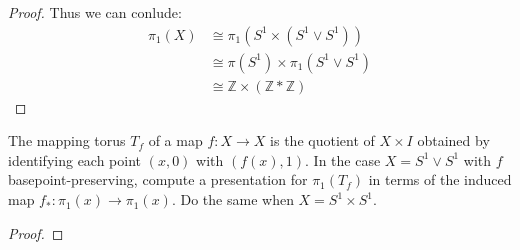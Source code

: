 \documentclass[12pt]{article}
\newenvironment{statement}[2][Statement]{\begin{trivlist}
\item[\hskip \labelsep {\bfseries #1}\hskip \labelsep {\bfseries #2.}]}{\end{trivlist}}
\begin{document}
\begin{proof}
  \par Thus we can conlude:
  \begin{align*}
    \pi_1(X) & \cong \pi_1(S^1 \times (S^1 \vee S^1)) \\
             & \cong \pi(S^1) \times \pi_1(S^1 \vee S^1) \\
             & \cong \mathbb{Z} \times (\mathbb{Z} \ast \mathbb{Z})
  \end{align*}
\end{proof}

\begin{statement}[Problem]{5}
 The mapping torus $T_f$ of a map $f:X \to X$ is the quotient of $X \times I$ 
 obtained by identifying each point $(x,0)$ with $(f(x),1)$. In the case $X = S^1 \vee S^1$ with $f$ basepoint-preserving,
 compute a presentation for $\pi_1(T_f)$ in terms of the induced map $f_*: \pi_1(x) \to \pi_1(x)$. Do the same when $X = S^1 \times S^1$.
\end{statement}
\begin{proof}

\end{proof}
\end{document}
